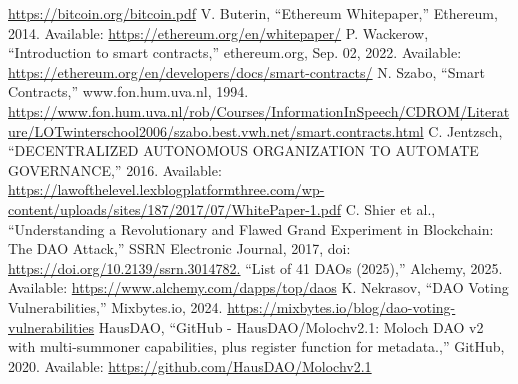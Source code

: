 \documentclass[conference]{IEEEtran}
\begin{document}
\begin{thebibliography}{00}
\url{https://bitcoin.org/bitcoin.pdf}
 V. Buterin, “Ethereum Whitepaper,” Ethereum, 2014. Available: 
\url{https://ethereum.org/en/whitepaper/}
 P. Wackerow, “Introduction to smart contracts,” ethereum.org, Sep. 02, 2022. Available: 
\url{https://ethereum.org/en/developers/docs/smart-contracts/}
 N. Szabo, “Smart Contracts,” www.fon.hum.uva.nl, 1994. 
\url{https://www.fon.hum.uva.nl/rob/Courses/InformationInSpeech/CDROM/Literature/LOTwinterschool2006/szabo.best.vwh.net/smart.contracts.html}
 C. Jentzsch, “DECENTRALIZED AUTONOMOUS ORGANIZATION TO AUTOMATE GOVERNANCE,” 2016. Available: 
\url{https://lawofthelevel.lexblogplatformthree.com/wp-content/uploads/sites/187/2017/07/WhitePaper-1.pdf}
 C. Shier et al., “Understanding a Revolutionary and Flawed Grand Experiment in Blockchain: The DAO Attack,” SSRN Electronic Journal, 2017, doi: 
\url{https://doi.org/10.2139/ssrn.3014782.}
 “List of 41 DAOs (2025),” Alchemy, 2025. Available:
\url{https://www.alchemy.com/dapps/top/daos}
 K. Nekrasov, “DAO Voting Vulnerabilities,” Mixbytes.io, 2024.
\url{https://mixbytes.io/blog/dao-voting-vulnerabilities}
 HausDAO, “GitHub - HausDAO/Molochv2.1: Moloch DAO v2 with multi-summoner capabilities, plus register function for metadata.,” GitHub, 2020. Available:
\url{https://github.com/HausDAO/Molochv2.1}
\end{thebibliography}
\end{document}
